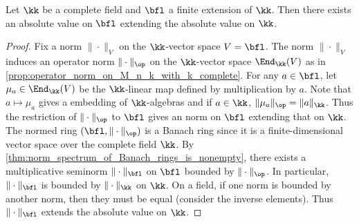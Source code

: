     \begin{lemma}\label{prop:existence_of_absolute_value_on_finite_extension_of_complete_fields}
        Let \(\kk\) be a complete field and \(\bfl\) a finite extension of \(\kk\).
        Then there exists an absolute value on \(\bfl\) extending the absolute value on \(\kk\).
    \end{lemma}
    \begin{proof}
        Fix a norm \(\|\cdot\|_V\) on the \(\kk\)-vector space \(V = \bfl\).
        The norm \(\|\cdot\|_V\) induces an operator norm \(\|\cdot\|_{\op}\) on the \(\kk\)-vector space \(\End_{\kk}(V)\) as in \cref{prop:operator_norm_on_M_n_k_with_k_complete}.
        For any \(a \in \bfl\), let \(\mu_a \in \End_{\kk}(V)\) be the \(\kk\)-linear map defined by multiplication by \(a\).
        Note that \(a \mapsto \mu_a\) gives a embedding of \(\kk\)-algebras and if \(a \in \kk\), \(\|\mu_a\|_{\op} = \|a\|_{\kk}\).
        Thus the restriction of \(\|\cdot\|_{\op}\) to \(\bfl\) gives an norm on \(\bfl\) extending that on \(\kk\).
        The normed ring \((\bfl, \|\cdot\|_{\op})\) is a Banach ring since it is a finite-dimensional vector space over the complete field \(\kk\).
        By \cref{thm:norm_spectrum_of_Banach_rings_is_nonempty}, there exists a multiplicative seminorm \(\|\cdot\|_{\bfl}\) on \(\bfl\) bounded by \(\|\cdot\|_{\op}\).
        In particular, \(\|\cdot\|_{\bfl}\) is bounded by \(\|\cdot\|_{\kk}\) on \(\kk\).
        On a field, if one norm is bounded by another norm, then they must be equal (consider the inverse elements).
        Thus \(\|\cdot\|_{\bfl}\) extends the absolute value on \(\kk\).
    \end{proof}

